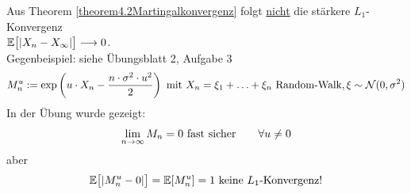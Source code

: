 \begin{bemerkung}
	Aus Theorem \ref{theorem4.2Martingalkonvergenz} folgt \ul{nicht} die stärkere $L_1$-Konvergenz\\ $\E\big[|X_n-X_\infty|\big]\longrightarrow0$.\\
	Gegenbeispiel: siehe Übungsblatt 2, Aufgabe 3
	\begin{align*}
		M_n^u:=\exp\left(u\cdot X_n-\frac{n\cdot\sigma^2\cdot u^2}{2}\right)\mit X_n=\xi_1+\ldots+\xi_n\text{ Random-Walk},\xi\sim\mathcal{N}(0,\sigma^2)
	\end{align*}
	In der Übung wurde gezeigt:
	\begin{align*}
		\limn M_n=0\text{ fast sicher}\qquad\forall u\neq0
	\end{align*}
	aber
	\begin{align*}
		\E\big[|M_n^u-0|\big]=\E[M_n^u]=1 \text{ keine $L_1$-Konvergenz!}
	\end{align*}
\end{bemerkung}


